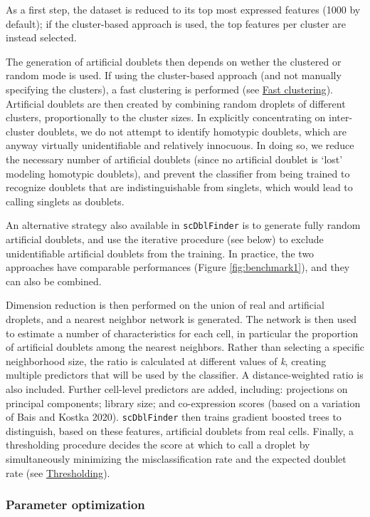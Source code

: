 \documentclass[10pt,a4paper,twocolumn]{article}
\begin{document}
As a first step, the dataset is reduced to its top most expressed features (1000 by default); if the cluster-based approach is used, the top features per cluster are instead selected.

The generation of artificial doublets then depends on wether the clustered or random mode is used.
If using the cluster-based approach (and not manually specifying the clusters), a fast clustering is performed (see \protect\hyperlink{fast-clustering}{Fast clustering}).
Artificial doublets are then created by combining random droplets of different clusters, proportionally to the cluster sizes.
In explicitly concentrating on inter-cluster doublets, we do not attempt to identify homotypic doublets, which are anyway virtually unidentifiable and relatively innocuous.
In doing so, we reduce the necessary number of artificial doublets (since no artificial doublet is `lost' modeling homotypic doublets), and prevent the classifier from being trained to recognize doublets that are indistinguishable from singlets, which would lead to calling singlets as doublets.

An alternative strategy also available in \texttt{scDblFinder} is to generate fully random artificial doublets, and use the iterative procedure (see below) to exclude unidentifiable artificial doublets from the training.
In practice, the two approaches have comparable performances (Figure \ref{fig:benchmark1}), and they can also be combined.

Dimension reduction is then performed on the union of real and artificial droplets, and a nearest neighbor network is generated.
The network is then used to estimate a number of characteristics for each cell, in particular the proportion of artificial doublets among the nearest neighbors.
Rather than selecting a specific neighborhood size, the ratio is calculated at different values of \emph{k}, creating multiple predictors that will be used by the classifier.
A distance-weighted ratio is also included.
Further cell-level predictors are added, including: projections on principal components; library size; and co-expression scores (based on a variation of Bais and Kostka 2020).
\texttt{scDblFinder} then trains gradient boosted trees to distinguish, based on these features, artificial doublets from real cells.
Finally, a thresholding procedure decides the score at which to call a droplet by simultaneously minimizing the misclassification rate and the expected doublet rate (see \protect\hyperlink{thresholding}{Thresholding}).

\subsubsection{Parameter optimization}
\end{document}
